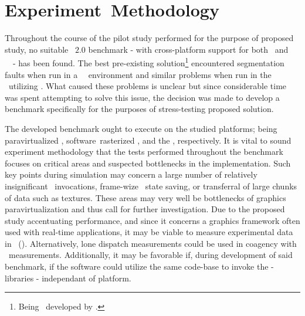 \section{Experiment~Methodology}
\label{sec:researchmethodology_experimentmethodology}
Throughout the course of the pilot study performed for the purpose of proposed study, no suitable \termopengles ~$2.0$ benchmark - with cross-platform support for both \termandroid\ and \termxeleven ~\termlinux\ - has been found.
The best pre-existing solution\footnote{Being \termglmarktwo\ developed by \termlinaro .} encountered segmentation faults when run in a \termsimics\ \termlinux\ environment and similar problems when run in the \termandroidemu\ utilizing \termqemu.
What caused these problems is unclear but since considerable time was spent attempting to solve this issue, the decision was made to develop a benchmark specifically for the purposes of stress-testing proposed solution.

The developed benchmark ought to execute on the studied platforms; being paravirtualized \termsimics , software~rasterized \termsimics , and the \termrefsolu , respectively.
It is vital to sound experiment methodology that the tests performed throughout the benchmark focuses on critical areas and suspected bottlenecks in the implementation.
Such key points during simulation may concern a large number of relatively insignificant \termopengles\ invocations, frame-wize \termopengles\ state saving, or transferral of large chunks of data such as textures.
These areas may very well be bottlenecks of graphics paravirtualization and thus call for further investigation.
Due to the proposed study accentuating performance, and since it concerns a graphics framework often used with real-time applications, it may be viable to measure experimental data in \termframespersecond ~(\termfps ).
Alternatively, lone dispatch measurements could be used in coagency with \termframespersecond\ measurements.
Additionally, it may be favorable if, during development of said benchmark, if the software could utilize the same code-base to invoke the \termopengles -libraries - independant of platform.
